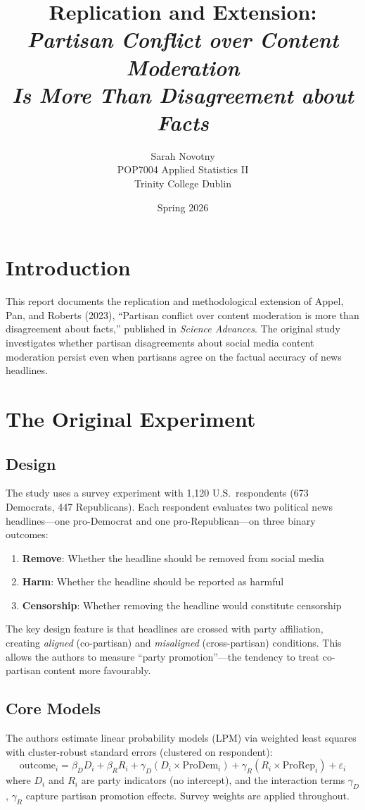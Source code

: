 \documentclass[12pt, a4paper]{article}
\title{Replication and Extension:\\
\textit{Partisan Conflict over Content Moderation\\Is More Than Disagreement about Facts}}
\author{Sarah Novotny\\
POP7004 Applied Statistics II\\
Trinity College Dublin}
\date{Spring 2026}
\renewcommand\_{\textunderscore\hspace{0pt}}
\begin{document}
\maketitle

\section{Introduction}

This report documents the replication and methodological extension of Appel, Pan, and Roberts (2023), ``Partisan conflict over content moderation is more than disagreement about facts,'' published in \textit{Science Advances}. The original study investigates whether partisan disagreements about social media content moderation persist even when partisans agree on the factual accuracy of news headlines.

\section{The Original Experiment}

\subsection{Design}
The study uses a survey experiment with 1{,}120 U.S.\ respondents (673 Democrats, 447 Republicans). Each respondent evaluates two political news headlines---one pro-Democrat and one pro-Republican---on three binary outcomes:
\begin{enumerate}[nosep]
  \item \textbf{Remove}: Whether the headline should be removed from social media
  \item \textbf{Harm}: Whether the headline should be reported as harmful
  \item \textbf{Censorship}: Whether removing the headline would constitute censorship
\end{enumerate}

The key design feature is that headlines are crossed with party affiliation, creating \textit{aligned} (co-partisan) and \textit{misaligned} (cross-partisan) conditions. This allows the authors to measure ``party promotion''---the tendency to treat co-partisan content more favourably.

\subsection{Core Models}
The authors estimate linear probability models (LPM) via weighted least squares with cluster-robust standard errors (clustered on respondent):
\begin{equation}
\text{outcome}_i = \beta_D D_i + \beta_R R_i + \gamma_D (D_i \times \text{ProDem}_i) + \gamma_R (R_i \times \text{ProRep}_i) + \varepsilon_i
\end{equation}
where $D_i$ and $R_i$ are party indicators (no intercept), and the interaction terms $\gamma_D$, $\gamma_R$ capture partisan promotion effects. Survey weights are applied throughout.
\end{document}
